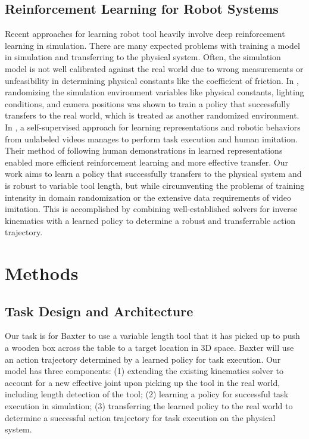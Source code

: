\documentclass[conference]{IEEEtran}
\begin{document}
\subsection{Reinforcement Learning for Robot Systems}
Recent approaches for learning robot tool heavily involve deep reinforcement learning in simulation. There are many expected problems with training a model in simulation and transferring to the physical system. Often, the simulation model is not well calibrated against the real world due to wrong measurements or unfeasibility in determining physical constants like the coefficient of friction. In \cite{b6}, randomizing the simulation environment variables like physical constants, lighting conditions, and camera positions was shown to train a policy that successfully transfers to the real world, which is treated as another randomized environment. In \cite{b5}, a self-supervised approach for learning representations and robotic behaviors from unlabeled videos manages to perform task execution and human imitation. Their method of following human demonstrations in learned representations enabled more efficient reinforcement learning and more effective transfer. Our work aims to learn a policy that successfully transfers to the physical system and is robust to variable tool length, but while circumventing the problems of training intensity in domain randomization or the extensive data requirements of video imitation. This is accomplished by combining well-established solvers for inverse kinematics with a learned policy to determine a robust and transferrable action trajectory.

\section{Methods}

\subsection{Task Design and Architecture}
Our task is for Baxter to use a variable length tool that it has picked up to push a wooden box across the table to a target location in 3D space. Baxter will use an action trajectory determined by a learned policy for task execution. Our model has three components: (1) extending the existing kinematics solver to account for a new effective joint upon picking up the tool in the real world, including length detection of the tool; (2) learning a policy for successful task execution in simulation; (3) transferring the learned policy to the real world to determine a successful action trajectory for task execution on the physical system.
\end{document}
